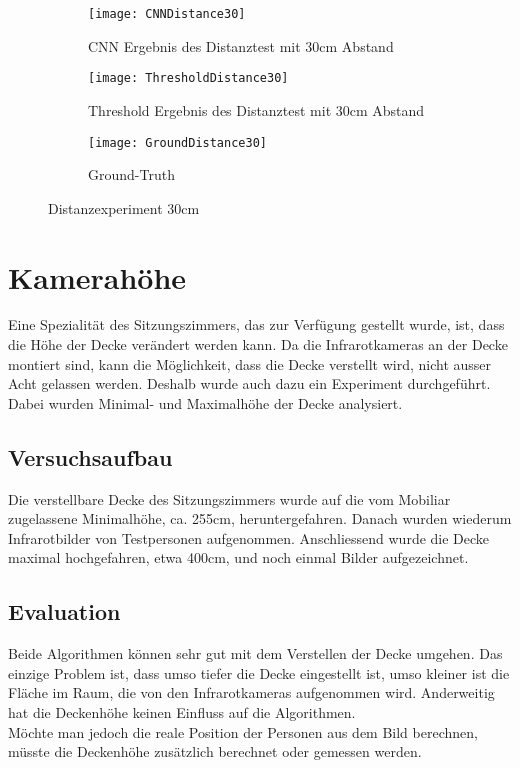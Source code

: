 \begin{figure}[H]
	\begin{subfigure}{.45\linewidth}
		\centering
		\texttt{[image: CNNDistance30]}
		\caption{\gls{CNN} Ergebnis des Distanztest mit 30cm Abstand}
		\label{fig:cnnDistance30}
	\end{subfigure}\hfill%
	\begin{subfigure}{.45\linewidth}
		\centering
		\texttt{[image: ThresholdDistance30]}
		\caption{Threshold Ergebnis des Distanztest mit 30cm Abstand}
		\label{fig:thresholdDistance30}
	\end{subfigure}
	\begin{subfigure}{\linewidth}
		\centering
		\texttt{[image: GroundDistance30]}
		\caption{Ground-Truth}
		\label{fig:groundDistance30}
	\end{subfigure}
	\caption{Distanzexperiment 30cm}
	\label{fig:Distance30}
\end{figure}

\section{Kamerahöhe}
\label{sec:cameraHeight}
Eine Spezialität des Sitzungszimmers, das zur Verfügung gestellt wurde, ist, dass die Höhe der Decke verändert werden kann. Da die Infrarotkameras an der Decke montiert sind, kann die Möglichkeit, dass die Decke verstellt wird, nicht ausser Acht gelassen werden. Deshalb wurde auch dazu ein Experiment durchgeführt. Dabei wurden Minimal- und Maximalhöhe der Decke analysiert.

\subsection{Versuchsaufbau}

Die verstellbare Decke des Sitzungszimmers wurde auf die vom Mobiliar zugelassene Minimalhöhe, ca. 255cm, heruntergefahren. Danach wurden wiederum Infrarotbilder von Testpersonen aufgenommen. Anschliessend wurde die Decke maximal hochgefahren, etwa 400cm, und noch einmal Bilder aufgezeichnet.


\subsection{Evaluation}
Beide Algorithmen können sehr gut mit dem Verstellen der Decke umgehen. Das einzige Problem ist, dass umso tiefer die Decke eingestellt ist, umso kleiner ist die Fläche im Raum, die von den Infrarotkameras aufgenommen wird. Anderweitig hat die Deckenhöhe keinen Einfluss auf die Algorithmen.\\
Möchte man jedoch die reale Position der Personen aus dem Bild berechnen, müsste die Deckenhöhe zusätzlich berechnet oder gemessen werden.

